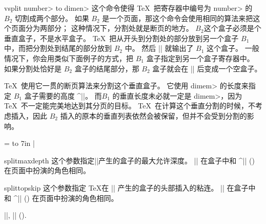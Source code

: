 \begindesc
\cts vsplit {\<number> {\bt to} \<dimen>}
\explain
这个命令使得 \TeX\ 把寄存器中编号为 \<number> 的 $B_2$ 切割成两个部分。
如果 $B_2$ 是一个页面，那这个命令会使用相同的算法来把这个页面分为两部分；
这种情况下，分割处就是断页的地方。
$B_2$这个盒子必须是个垂直盒子，不是水平盒子。
\TeX\ 把从开头到分割处的部分放到另一个盒子 $B_1$ 中，而把分割处到结尾的部分放到 $B_2$ 中。
然后 |\vsplit| 就输出了 $B_1$ 这个盒子。
一般情况下，你会用类似下面例子的方式，把 $B_1$ 盒子指定到另一个盒子寄存器中。
如果分割处恰好是 $B_2$ 盒子的结尾部分，那 $B_2$ 盒子就会在 |\vsplit| 后变成一个空盒子。



\TeX\ 使用它一贯的断页算法来分割这个垂直盒子。
它使用 \<dimem> 的长度来指定 $B_1$ 盒子需要的高度 ^|\pagegoal|。
而$B_1$ 的垂直长度未必就一定是 \<dimem>，因为 \TeX\ 不一定能完美地达到其分页的目标。
\TeX\ 在计算这个垂直分割的时候，不考虑插入，因此 $B_2$ 插入的原本的垂直列表依然会被保留，但并不会受到分割的影响。



\example
{} =  to 7in
|
\endexample
\enddesc



\begindesc
\cts splitmaxdepth {}
\explain
这个参数指定|\vsplit|产生的盒子的最大允许深度。
|\splitmaxdepth| 在盒子中和 ^|\maxdepth| (\xref \maxdepth) 在页面中扮演的角色相同。
\enddesc



\begindesc
\cts splittopskip {}
\explain
这个参数指定 \TeX 在 |\vsplit| 产生的盒子的头部插入的粘连。
|\splittopskip| 在盒子中和 ^|\topskip| (\xref \topskip) 在页面中扮演的角色相同。
\enddesc



\see |\splitbotmark|, |\splitfirstmark| (\xref \splitfirstmark).

\enddescriptions \endchapter \byebye

